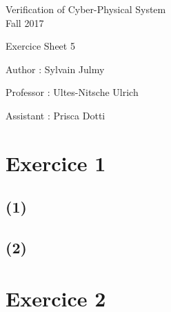 \documentclass[a4paper,11pt]{report}
\author{Sylvain Julmy}
\date{\today}
\begin{document}
\begin{center}
\Large{
    Verification of Cyber-Physical System\\
    Fall 2017
  }
  
  \noindent\makebox[\linewidth]{\rule{\linewidth}{0.4pt}}
  Exercice Sheet 5

  \vspace*{1.4cm}

  Author : Sylvain Julmy
  \noindent\makebox[\linewidth]{\rule{\linewidth}{0.4pt}}

  \begin{flushleft}
    Professor : Ultes-Nitsche Ulrich
    
    Assistant : Prisca Dotti
  \end{flushleft}

  \noindent\makebox[\linewidth]{\rule{\textwidth}{1pt}}
\end{center}

\section*{Exercice 1}

\subsection*{(1)}

\subsection*{(2)}

\section*{Exercice 2}
\end{document}
